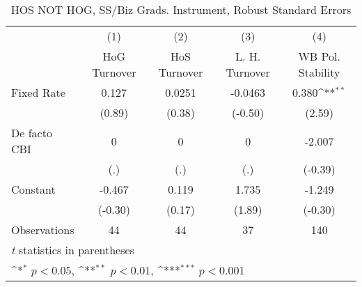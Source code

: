 \begin{table}[htbp]\centering
\def\sym#1{\ifmmode^{#1}\else\(^{#1}\)\fi}
\caption{HOS NOT HOG, SS/Biz Grads. Instrument, Robust Standard Errors \label{NOhoshogIfivs4}}
\begin{tabular}{l*{4}{c}}
\toprule
                                        &\multicolumn{1}{c}{(1)}&\multicolumn{1}{c}{(2)}&\multicolumn{1}{c}{(3)}&\multicolumn{1}{c}{(4)}\\
                                        &\multicolumn{1}{c}{HoG Turnover}&\multicolumn{1}{c}{HoS Turnover}&\multicolumn{1}{c}{L. H. Turnover}&\multicolumn{1}{c}{WB Pol. Stability}\\
\midrule
Fixed Rate                              &    0.127         &   0.0251         &  -0.0463         &    0.380\sym{**} \\
                                        &   (0.89)         &   (0.38)         &  (-0.50)         &   (2.59)         \\
\addlinespace
De facto CBI                            &        0         &        0         &        0         &   -2.007         \\
                                        &      (.)         &      (.)         &      (.)         &  (-0.39)         \\
\addlinespace
Constant                                &   -0.467         &    0.119         &    1.735         &   -1.249         \\
                                        &  (-0.30)         &   (0.17)         &   (1.89)         &  (-0.30)         \\
\midrule
Observations                            &       44         &       44         &       37         &      140         \\
\bottomrule
\multicolumn{5}{l}{\footnotesize \textit{t} statistics in parentheses}\\
\multicolumn{5}{l}{\footnotesize \sym{*} \(p<0.05\), \sym{**} \(p<0.01\), \sym{***} \(p<0.001\)}\\
\end{tabular}
\end{table}
